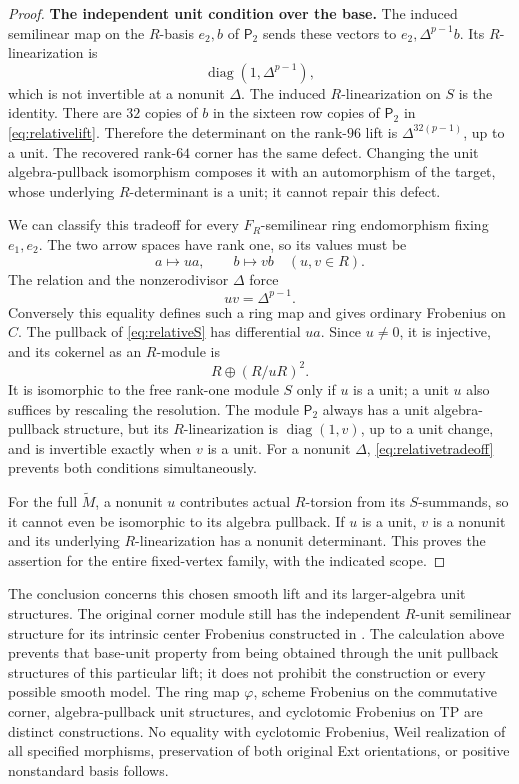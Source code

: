 \begin{proof}
\par\smallskip\noindent\textbf{The independent unit condition over the base.}\quad
The induced semilinear map on the $R$-basis $e_2,b$
of $\mathsf P_2$ sends these vectors to
$e_2,\Delta^{p-1}b$. Its $R$-linearization is
\begin{equation}\label{eq:relativebaseunit}
 \operatorname{diag}(1,\Delta^{p-1}),
\end{equation}
which is not invertible at a nonunit $\Delta$.
The induced $R$-linearization on $S$ is the identity.
There are $32$ copies of $b$ in the sixteen row copies
of $\mathsf P_2$ in \eqref{eq:relativelift}. Therefore
the determinant on the rank-$96$ lift is
$\Delta^{32(p-1)}$, up to a unit.
The recovered rank-$64$ corner has the same defect.
Changing the unit algebra-pullback isomorphism composes
it with an automorphism of the target, whose underlying
$R$-determinant is a unit; it cannot repair this defect.

We can classify this tradeoff for every
$F_R$-semilinear ring endomorphism fixing $e_1,e_2$.
The two arrow spaces have rank one, so its values must be
\[
 a\longmapsto ua,\qquad b\longmapsto vb
       \quad(u,v\in R).
\]
The relation and the nonzerodivisor $\Delta$ force
\begin{equation}\label{eq:relativetradeoff}
 uv=\Delta^{p-1}.
\end{equation}
Conversely this equality defines such a ring map and
gives ordinary Frobenius on $C$.
The pullback of \eqref{eq:relativeS} has differential
$ua$. Since $u\ne0$, it is injective, and its cokernel
as an $R$-module is
\[
 R\oplus(R/uR)^2.
\]
It is isomorphic to the free rank-one module $S$ only
if $u$ is a unit; a unit $u$ also suffices by rescaling
the resolution. The module $\mathsf P_2$ always has a
unit algebra-pullback structure, but its $R$-linearization
is $\operatorname{diag}(1,v)$, up to a unit change,
and is invertible exactly when $v$ is a unit.
For a nonunit $\Delta$, \eqref{eq:relativetradeoff}
prevents both conditions simultaneously.

For the full $\widetilde M$, a nonunit $u$ contributes
actual $R$-torsion from its $S$-summands, so it cannot
even be isomorphic to its algebra pullback. If $u$ is
a unit, $v$ is a nonunit and its underlying
$R$-linearization has a nonunit determinant. This
proves the assertion for the entire fixed-vertex
family, with the indicated scope.
\end{proof}

The conclusion concerns this chosen smooth lift and its
larger-algebra unit structures. The original corner module
still has the independent $R$-unit semilinear structure for
its intrinsic center Frobenius constructed in .
The calculation above prevents that base-unit property
from being obtained through the unit pullback structures
of this particular lift; it does not prohibit the
 construction or every possible smooth model.
The ring map $\varphi$, scheme Frobenius on the commutative
corner, algebra-pullback unit structures, and cyclotomic
Frobenius on TP are distinct constructions. No equality
with cyclotomic Frobenius, Weil realization of all
specified morphisms, preservation of both original Ext
orientations, or positive nonstandard basis follows.


